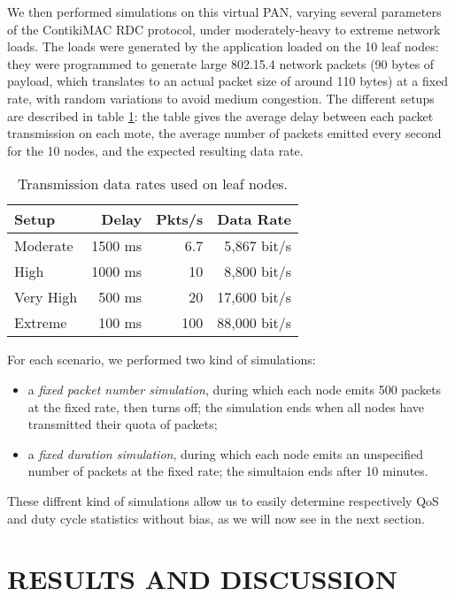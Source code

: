 \documentclass[a4paper,twoside]{article}
\begin{document}
We then performed simulations on this virtual PAN, varying several parameters
of the ContikiMAC RDC protocol, under moderately-heavy to extreme network
loads. The loads were generated by the application loaded on the 10 leaf
nodes: they were programmed to generate large 802.15.4 network packets
(90 bytes of payload, which translates to an actual packet size of
around 110 bytes) at a fixed rate, with random variations to avoid
medium congestion. The different setups are described in table
\ref{TblDataRates}: the table gives the average delay between
each packet transmission on each mote, the average number of
packets emitted every second for the 10 nodes, and the expected
resulting data rate.

\begin{table}[htb]
\centering
\begin{tabular}{|l|r|r|r|}
\hline
Setup     &  Delay  & Pkts/s & Data Rate \\
\hline
Moderate  & 1500 ms &   6.7  &  5,867 bit/s \\ 
High      & 1000 ms &  10    &  8,800 bit/s \\
Very High &  500 ms &  20    & 17,600 bit/s \\
Extreme   &  100 ms & 100    & 88,000 bit/s \\
\hline
\end{tabular}
\caption{Transmission data rates used on leaf nodes.}
\label{TblDataRates}
\end{table}

For each scenario, we performed two kind of simulations:
\begin{itemize}
\item a \emph{fixed packet number simulation}, during which each node emits
500 packets at the fixed rate, then turns off; the simulation ends when all
nodes have transmitted their quota of packets;

\item a \emph{fixed duration simulation}, during which each node emits an
unspecified number of packets at the fixed rate; the simultaion ends after
10 minutes.
\end{itemize}

These diffrent kind of simulations allow us to easily determine respectively
QoS and duty cycle statistics without bias, as we will now see in the next
section.



\section{\uppercase{Results and Discussion}}
\end{document}
